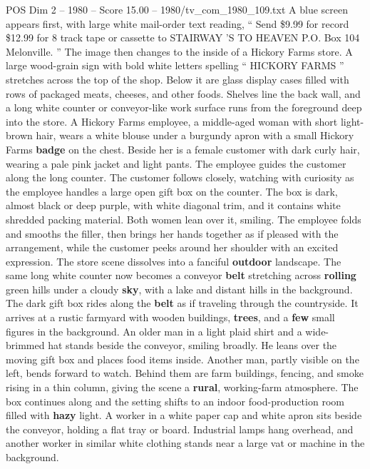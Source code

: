 \begin{textsample}{POS Dim 2 – 1980 – Score 15.00 – 1980/tv\_com\_1980\_109.txt}  \label{ex:f2_pos_067}
A blue screen appears first, with large white mail-order text reading, “ Send \$9.99 for record \$12.99 for 8 track tape or cassette to STAIRWAY ’S TO HEAVEN P.O.
Box 104 Melonville. ” The image then changes to the inside of a Hickory Farms store.
A large wood-grain sign with bold white letters spelling “ HICKORY FARMS ” stretches across the top of the shop.
Below it are glass display cases filled with rows of packaged meats, cheeses, and other foods.
Shelves line the back wall, and a long white counter or conveyor-like work surface runs from the foreground deep into the store.
A Hickory Farms employee, a middle-aged woman with short light-brown hair, wears a white blouse under a burgundy apron with a small Hickory Farms \textbf{badge} on the chest.
Beside her is a female customer with dark curly hair, wearing a pale pink jacket and light pants.
The employee guides the customer along the long counter.
The customer follows closely, watching with curiosity as the employee handles a large open gift box on the counter.
The box is dark, almost black or deep purple, with white diagonal trim, and it contains white shredded packing material.
Both women lean over it, smiling.
The employee folds and smooths the filler, then brings her hands together as if pleased with the arrangement, while the customer peeks around her shoulder with an excited expression.
The store scene dissolves into a fanciful \textbf{outdoor} landscape.
The same long white counter now becomes a conveyor \textbf{belt} stretching across \textbf{rolling} green hills under a cloudy \textbf{sky}, with a lake and distant hills in the background.
The dark gift box rides along the \textbf{belt} as if traveling through the countryside.
It arrives at a rustic farmyard with wooden buildings, \textbf{trees}, and a \textbf{few} small figures in the background.
An older man in a light plaid shirt and a wide-brimmed hat stands beside the conveyor, smiling broadly.
He leans over the moving gift box and places food items inside.
Another man, partly visible on the left, bends forward to watch.
Behind them are farm buildings, fencing, and smoke rising in a thin column, giving the scene a \textbf{rural}, working-farm atmosphere.
The box continues along and the setting shifts to an indoor food-production room filled with \textbf{hazy} light.
A worker in a white paper cap and white apron sits beside the conveyor, holding a flat tray or board.
Industrial lamps hang overhead, and another worker in similar white clothing stands near a large vat or machine in the background.

\end{textsample}
